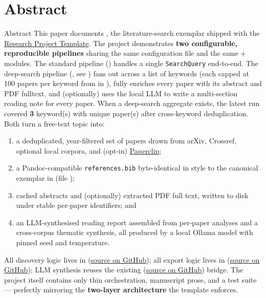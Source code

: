 \documentclass[
  ignorenonframetext,
]{beamer}
\author{\texorpdfstring{}{}}
\date{}
\providecommand{\tightlist}{%
  \setlength{\itemsep}{0pt}\setlength{\parskip}{0pt}}
\begin{document}
\section{Abstract}\label{sec:abstract}

\begin{frame}{Abstract}
This paper documents , the
literature-search exemplar shipped with the
\href{https://github.com/docxology/template}{Research Project Template}.
The project demonstrates \textbf{two configurable, reproducible
pipelines} sharing the same configuration file and the same
 + 
modules. The standard pipeline
() handles a single
\texttt{SearchQuery} end-to-end. The deep-search pipeline
(, see )
fans out across a list of keywords (each capped at 100 papers per
keyword from  in
), fully enriches every paper with its
abstract and PDF fulltext, and (optionally) uses the local LLM to write
a multi-section reading note for every paper. When a deep-search
aggregate exists, the latest run covered \textbf{3} keyword(s) with
\textbf{} unique paper(s) after cross-keyword deduplication. Both turn a
free-text topic into:

\begin{enumerate}
\tightlist
\item
  a deduplicated, year-filtered set of papers drawn from arXiv,
  Crossref, optional local corpora, and (opt-in)
  \href{https://paperclip.gxl.ai/}{Paperclip};
\item
  a Pandoc-compatible \texttt{references.bib} byte-identical in style to
  the canonical exemplar in
  \href{../../template_code_project/manuscript/references.bib}{}
  (file );
\item
  cached abstracts and (optionally) extracted PDF full text, written to
  disk under stable per-paper identifiers; and
\item
  an LLM-synthesised reading report assembled from per-paper analyses
  and a cross-corpus thematic synthesis, all produced by a local Ollama
  model with pinned seed and temperature.
\end{enumerate}

All discovery logic lives in 
(\href{https://github.com/docxology/template/tree/main/infrastructure/search/literature}{source
on GitHub}); all export logic lives in
(\href{https://github.com/docxology/template/tree/main/infrastructure/reference/citation}{source
on GitHub}); LLM synthesis reuses the existing
(\href{https://github.com/docxology/template/tree/main/infrastructure/llm}{source
on GitHub}) bridge. The project itself contains only thin orchestration,
manuscript prose, and a test suite --- perfectly mirroring the
\textbf{two-layer architecture} the template enforces.


\end{frame}
\end{document}
